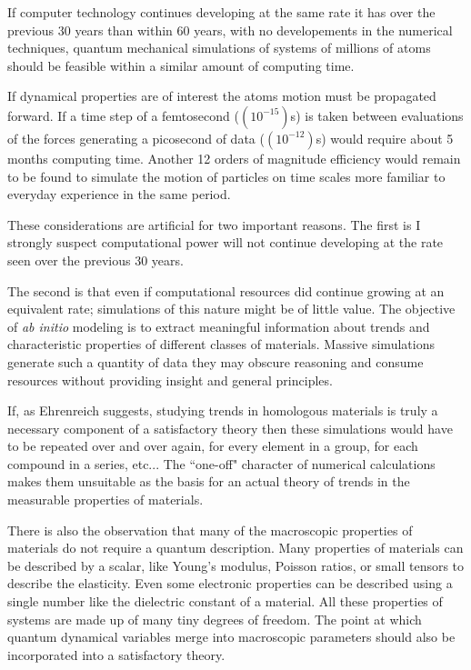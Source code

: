 If computer technology continues developing at the same rate it has
over the previous 30 years than within 60 years, with no developements in the numerical techniques, 
quantum mechanical simulations of systems of millions of atoms should be feasible
within a similar amount of computing time. 

If dynamical properties are of interest the atoms motion must be propagated forward. 
If a time step of a femtosecond ($(10^{-15})$s) is taken between evaluations of the 
forces generating a picosecond of data ($(10^{-12})$s) would require about 5 months 
computing time. Another 12 orders of magnitude efficiency would remain to be found to 
simulate the motion of particles on time scales more familiar to everyday experience
in the same period.

These considerations are artificial for two important reasons. The first
is I strongly suspect computational power will not continue developing at the rate
seen over the previous 30 years. 

The second is that even if computational resources did continue growing 
at an equivalent rate; simulations of this nature might be of little value.
The objective of {\it ab initio} modeling is to extract meaningful information
about trends and characteristic properties of different classes of materials. 
Massive simulations generate such a quantity of data they may obscure 
reasoning and consume resources without providing insight and general principles.

If, as Ehrenreich suggests, studying trends in homologous materials is truly a necessary component of a satisfactory
theory then these simulations would have to be repeated over and over again, for every element in a group,
for each compound in a series, etc... The ``one-off" character of numerical calculations makes them unsuitable
as the basis for an actual theory of trends in the measurable properties of materials.

There is also the observation that many of the macroscopic properties of materials do not require a quantum description.
Many properties of materials can be described by a scalar, like Young's modulus, Poisson ratios, 
or small tensors to describe the elasticity. Even some electronic properties 
can be described using a single number like the dielectric constant of a material.
All these properties of systems are made up of many tiny degrees of freedom.
The point at which quantum dynamical variables merge into macroscopic parameters 
should also be incorporated into a satisfactory theory.

